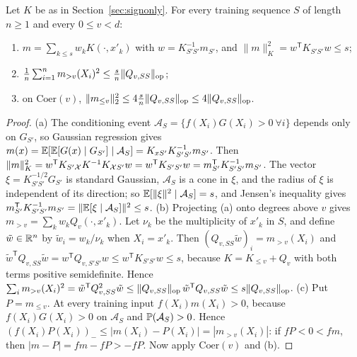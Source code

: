 \begin{lemma}\label{lem:meantrain}
Let $K$ be as in Section~\ref{sec:signonly}. For every training sequence
$S$ of length $n\ge1$ and every $0\le v<d$:
\begin{enumerate}
\item[(a)] $m=\sum_{k\le s}w_kK(\cdot,x'_k)$ with $w=K_{S'S'}^{-1}m_{S'}$, and
$\|m\|_K^2=w^{\mathsf T}K_{S'S'}w\le s$;
\item[(b)] $\frac1n\sum_{i=1}^nm_{>v}(X_i)^2\le\frac sn\|Q_{v,SS}\|_{\rm op}$;
\item[(c)] on $\mathrm{Coer}(v)$,
$\|m_{\le v}\|_2^2\le4\frac sn\|Q_{v,SS}\|_{\rm op}\le4\|Q_{v,SS}\|_{\rm op}$.
\end{enumerate}
\end{lemma}
\begin{proof}
(a) The conditioning event $\mathcal A_S=\{f(X_i)G(X_i)>0\ \forall i\}$
depends only on $G_{S'}$, so Gaussian regression gives
$m(x)=\mathbb E[\mathbb E[G(x)\mid G_{S'}]\mid\mathcal A_S]=K_{xS'}K_{S'S'}^{-1}m_{S'}$.
Then $\|m\|_K^2=w^{\mathsf T}K_{S'\mathcal X}K^{-1}K_{\mathcal X S'}w=w^{\mathsf T}K_{S'S'}w
=m_{S'}^{\mathsf T}K_{S'S'}^{-1}m_{S'}$. The vector
$\xi=K_{S'S'}^{-1/2}G_{S'}$ is standard Gaussian, $\mathcal A_S$ is a cone
in $\xi$, and the radius of $\xi$ is independent of its direction; so
$\mathbb E[\|\xi\|^2\mid\mathcal A_S]=s$, and Jensen's inequality gives
$m_{S'}^{\mathsf T}K_{S'S'}^{-1}m_{S'}=\|\mathbb E[\xi\mid\mathcal A_S]\|^2\le s$.
(b) Projecting (a) onto degrees above $v$ gives
$m_{>v}=\sum_kw_kQ_v(\cdot,x'_k)$. Let $\nu_k$ be the multiplicity of
$x'_k$ in $S$, and define $\tilde w\in\mathbb R^n$ by $\tilde w_i=w_k/\nu_k$ when
$X_i=x'_k$. Then $(Q_{v,SS}\tilde w)_i=m_{>v}(X_i)$ and
$\tilde w^{\mathsf T}Q_{v,SS}\tilde w=w^{\mathsf T}Q_{v,S'S'}w\le
w^{\mathsf T}K_{S'S'}w\le s$, because $K=K_{\le v}+Q_v$ with both terms
positive semidefinite. Hence $\sum_im_{>v}(X_i)^2=\tilde w^{\mathsf T}
Q_{v,SS}^2\tilde w\le\|Q_{v,SS}\|_{\rm op}\,\tilde w^{\mathsf T}Q_{v,SS}
\tilde w\le s\|Q_{v,SS}\|_{\rm op}$.
(c) Put $P=m_{\le v}$. At every training input $f(X_i)m(X_i)>0$, because
$f(X_i)G(X_i)>0$ on $\mathcal A_S$ and $\mathbb P(\mathcal A_S)>0$. Hence
$(f(X_i)P(X_i))_-\le|m(X_i)-P(X_i)|=|m_{>v}(X_i)|$: if $fP<0<fm$, then
$|m-P|=fm-fP>-fP$. Now apply $\mathrm{Coer}(v)$ and (b).
\end{proof}

